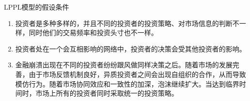 \begin{frame}[t]{LPPL模型的假设条件}
    \begin{enumerate}
        \item 投资者是多种多样的，并且不同的投资者的投资策略、对市场信息的判断不一样，同时他们的交易频率和投资头寸也不一样。\\[0.5cm]
        \item 投资者处在一个会互相影响的网络中，投资者的决策会受其他投资者的影响。\\[0.5cm]
        \item 金融崩溃出现在不同的投资者纷纷跟风做同样决策之后。随着市场的发展完善，由于市场反馈机制良好，异质投资者之间会出现自组织的合作，从而导致模仿行为。随着市场协同效应和一致性的加深，泡沫继续扩大。当达到临界时间时，市场上所有的投资者同时采取统一的投资策略。
    \end{enumerate}
\end{frame}
